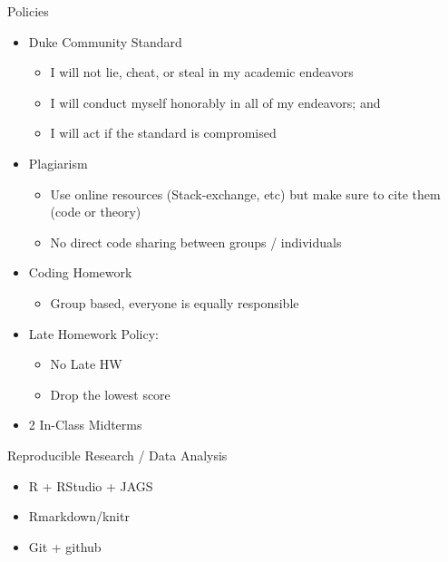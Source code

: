 \documentclass[ignorenonframetext,]{beamer}
\providecommand{\tightlist}{%
  \setlength{\itemsep}{0pt}\setlength{\parskip}{0pt}}
\begin{document}
\begin{frame}{Policies}
\protect\hypertarget{policies}{}

\begin{itemize}[<+->]
\tightlist
\item
  Duke Community Standard

  \begin{itemize}[<+->]
  \tightlist
  \item
    I will not lie, cheat, or steal in my academic endeavors
  \item
    I will conduct myself honorably in all of my endeavors; and
  \item
    I will act if the standard is compromised
  \end{itemize}
\item
  Plagiarism

  \begin{itemize}[<+->]
  \tightlist
  \item
    Use online resources (Stack-exchange, etc) but make sure to cite
    them (code or theory)
  \item
    No direct code sharing between groups / individuals
  \end{itemize}
\item
  Coding Homework

  \begin{itemize}[<+->]
  \tightlist
  \item
    Group based, everyone is equally responsible
  \end{itemize}
\item
  Late Homework Policy:

  \begin{itemize}[<+->]
  \tightlist
  \item
    No Late HW
  \item
    Drop the lowest score
  \end{itemize}
\item
  2 In-Class Midterms
\end{itemize}

\end{frame}

\begin{frame}{Reproducible Research / Data Analysis}
\protect\hypertarget{reproducible-research-data-analysis}{}

\begin{itemize}[<+->]
\item
  R + RStudio + JAGS
\item
  Rmarkdown/knitr
\item
  Git + github
\end{itemize}

\end{frame}
\end{document}
